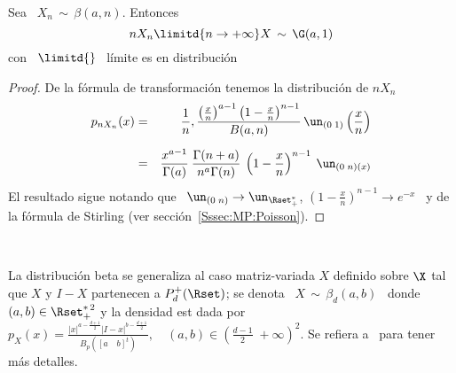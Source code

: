 \begin{lema}
\label{Lem:GamaLimiteBeta}
%
  Sea \ $X_n \, \sim \, \beta(a,n)$. Entonces
  \[
  n X_n \limitd{n \to +\infty} X \, \sim \, \G(a,1)
  \]
  con \ $\displaystyle \limitd{}$ \ l\'imite es en distribuci\'on
\end{lema}
%
\begin{proof}
  De la f\'ormula de transformaci\'on tenemos la distribuci\'on de $n X_n$
  \begin{eqnarray*}
  p_{n X_n}(x) & = & \frac{1}{n} , \frac{\left( \frac{x}{n} \right)^{a-1} \left( 1
  - \frac{x}{n} \right)^{n-1}}{B(a,n)} \, \un_{(0 \; 1)}\left( \frac{x}{n} \right)\\[2mm]
  & = & \frac{x^{a-1}}{\Gamma(a)} \: \frac{\Gamma(n+a)}{n^a \Gamma(n)} \: \left( 1 -
  \frac{x}{n} \right)^{n-1} \: \un_{(0 \; n)(x)}
  \end{eqnarray*}
  El resultado sigue  notando que \ $\un_{(0 \;  n)} \to \un_{\Rset_+^*}$, \quad
  $\left(  1 -  \frac{x}{n} \right)^{n-1}  \to e^{-x}$  \ y  de la  f\'ormula de
  Stirling (ver secci\'on~\ref{Sssec:MP:Poisson}).
\end{proof}

\

La distribuci\'on beta  se generaliza al caso matriz-variada  $X$ definido sobre
$\X$ tal que $X$ y $I-X$ partenecen  a $P_d^+(\Rset)$; se denota \ $X \, \sim \,
\beta_d(a,b)$ \ donde \ $(a,b) \in \Rset_+^{*  \, 2}$ y la densidad est dada por
$\displaystyle   p_X(x)    =   \frac{|x|^{a   -    \frac{d+1}{2}}   |I-x|^{b   -
    \frac{d+1}{2}}}{B_p\left([a  \quad  b]^t\right)},  \quad  (a,b)  \in  \left(
  \frac{d-1}{2} \; +\infty \right)^2$. Se refiera a~\cite[Cap.~5]{GupNag99} para
tener m\'as detalles.
